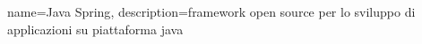{
	name={Java Spring},
	description={framework open source per lo sviluppo di applicazioni su piattaforma java}
}